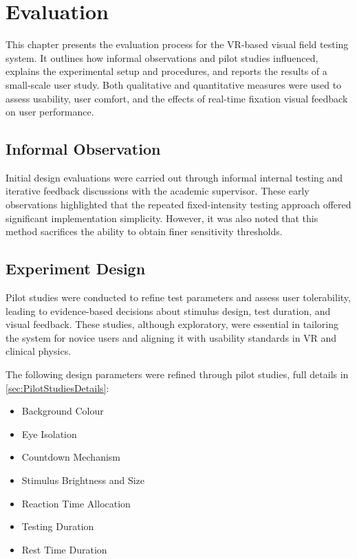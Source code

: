 \documentclass{l4proj}
\begin{document}
\chapter{Evaluation} 

This chapter presents the evaluation process for the VR-based visual field testing system. It outlines how informal observations and pilot studies influenced, explains the experimental setup and procedures, and reports the results of a small-scale user study. Both qualitative and quantitative measures were used to assess usability, user comfort, and the effects of real-time fixation visual feedback on user performance.

\section{Informal Observation}
Initial design evaluations were carried out through informal internal testing and iterative feedback discussions with the academic supervisor. These early observations highlighted that the repeated fixed-intensity testing approach offered significant implementation simplicity. However, it was also noted that this method sacrifices the ability to obtain finer sensitivity thresholds.

\section{Experiment Design}
Pilot studies were conducted to refine test parameters and assess user tolerability, leading to evidence-based decisions about stimulus design, test duration, and visual feedback. These studies, although exploratory, were essential in tailoring the system for novice users and aligning it with usability standards in VR and clinical physics. 

The following design parameters were refined through pilot studies, full details in \ref{sec:PilotStudiesDetails}:
\begin{itemize}
    \item Background Colour
    \item Eye Isolation
    \item Countdown Mechanism
    \item Stimulus Brightness and Size
    \item Reaction Time Allocation
    \item Testing Duration
    \item Rest Time Duration
\end{itemize}
\end{document}
